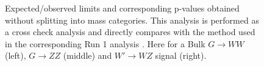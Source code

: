 \begin{figure}[h!]
\caption{Expected/observed limits and corresponding p-values obtained without splitting into mass categories. This analysis is performed as a cross check analysis and directly compares with the method used in the corresponding Run 1 analysis \cite{CMS-PAS-EXO-14-024}.  Here for a Bulk $G\rightarrow WW$ (left), $G\rightarrow ZZ$ (middle) and $W'\rightarrow WZ$ signal (right).}
\label{fig:searchI:Limits_CombOld}
\end{figure}


%
%

